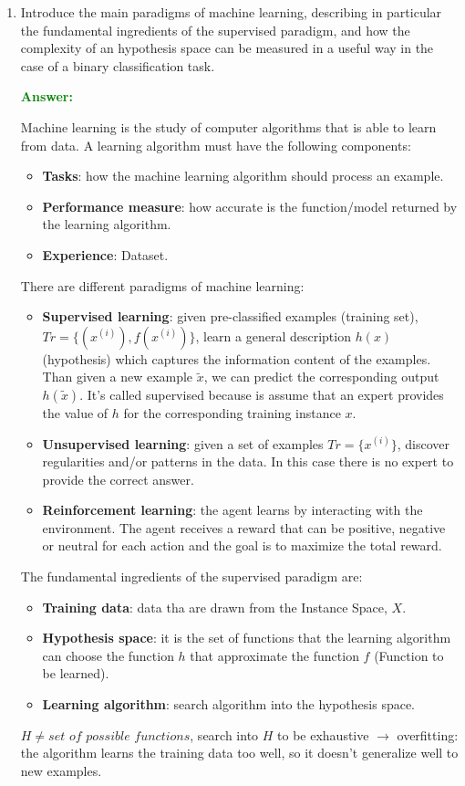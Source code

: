 \documentclass[12pt]{article}
\begin{document}
\begin{enumerate}[label=\textbf{ML.\arabic*}]
    \item Introduce the main paradigms of machine learning, describing in particular the fundamental ingredients of the supervised paradigm, and how the complexity of an hypothesis space can be measured in a useful way in the case of a binary classification task.

    \textcolor{green}{\textbf{Answer:}}

    Machine learning is the study of computer algorithms that is able to learn from data.
    A learning algorithm must have the following components:
    \begin{itemize}
        \item \textbf{Tasks}: how the machine learning algorithm should process an example.
        \item \textbf{Performance measure}: how accurate is the function/model returned by the learning algorithm.
        \item \textbf{Experience}: Dataset.
    \end{itemize}
    There are different paradigms of machine learning:
    \begin{itemize}
        \item \textbf{Supervised learning}\label{q:ml-paradigms}: given pre-classified examples (training set), $Tr = \{(x^{(i)}),f(x^{(i)})\}$, learn a general description $h(x)$ (hypothesis) which captures the information content of the examples.
        Than given a new example $\tilde{x}$, we can predict the corresponding output $h(\tilde{x})$.
        It's called supervised because is assume that an expert provides the value of $h$ for the corresponding training instance $x$. 
        \item \textbf{Unsupervised learning}: given a set of examples $Tr = \{x^{(i)}\}$, discover regularities and/or patterns in the data.
        In this case there is no expert to provide the correct answer.
        \item \textbf{Reinforcement learning}: the agent learns by interacting with the environment.
        The agent receives a reward that can be positive, negative or neutral for each action and the goal is to maximize the total reward.
    \end{itemize}

    The fundamental ingredients of the supervised paradigm are:
    \begin{itemize}
        \item \textbf{Training data}: data tha are drawn from the Instance Space, $X$.
        \item \textbf{Hypothesis space}: it is the set of functions that the learning algorithm 
        can choose the function $h$ that approximate the function $f$ (Function to be learned).
        \item \textbf{Learning algorithm}: search algorithm into the hypothesis space.
    \end{itemize}    
    $H \neq \textit{set of possible functions}$, search into $H$ to be exhaustive $\rightarrow$ overfitting:
    the algorithm learns the training data too well, so it doesn't generalize well to new examples.


\end{enumerate}
\end{document}
